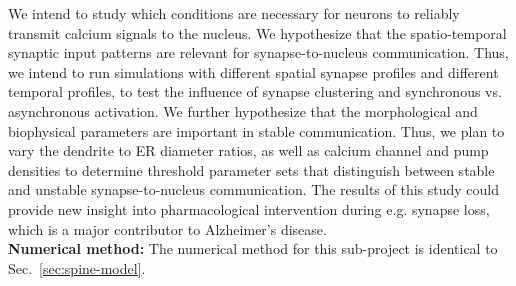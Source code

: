 We intend to study which conditions are necessary for neurons to reliably transmit calcium signals to the nucleus. We hypothesize that the spatio-temporal synaptic input patterns are relevant for synapse-to-nucleus communication. Thus, we intend to run simulations with different spatial synapse profiles and different temporal profiles, to test the influence of synapse clustering and synchronous vs. asynchronous activation. We further hypothesize that the morphological and biophysical parameters are important in stable communication. Thus, we plan to vary the dendrite to ER diameter ratios, as well as calcium channel and pump densities to determine threshold parameter sets that distinguish between stable and unstable synapse-to-nucleus communication. The results of this study could provide new insight into pharmacological intervention during e.g. synapse loss, which is a major contributor to Alzheimer's disease. \\
\textbf{Numerical method:} The numerical method for this sub-project is identical to Sec.~\ref{sec:spine-model}. \\
